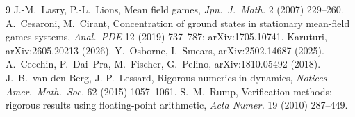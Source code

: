 \documentclass[11pt]{article}
\begin{document}
\begin{thebibliography}{9}\small
{} J.-M.~Lasry, P.-L.~Lions, Mean field games, \emph{Jpn.\ J.\ Math.} 2 (2007) 229--260.
 A.~Cesaroni, M.~Cirant, Concentration of ground states in stationary mean-field games systems, \emph{Anal.\ PDE} 12 (2019) 737--787; arXiv:1705.10741.
 Karuturi, arXiv:2605.20213 (2026).
 Y.~Osborne, I.~Smears, arXiv:2502.14687 (2025).
 A.~Cecchin, P.~Dai~Pra, M.~Fischer, G.~Pelino, arXiv:1810.05492 (2018).
 J.~B.~van den Berg, J.-P.~Lessard, Rigorous numerics in dynamics, \emph{Notices Amer.\ Math.\ Soc.} 62 (2015) 1057--1061.
 S.~M.~Rump, Verification methods: rigorous results using floating-point arithmetic, \emph{Acta Numer.} 19 (2010) 287--449.
\end{thebibliography}
\end{document}
